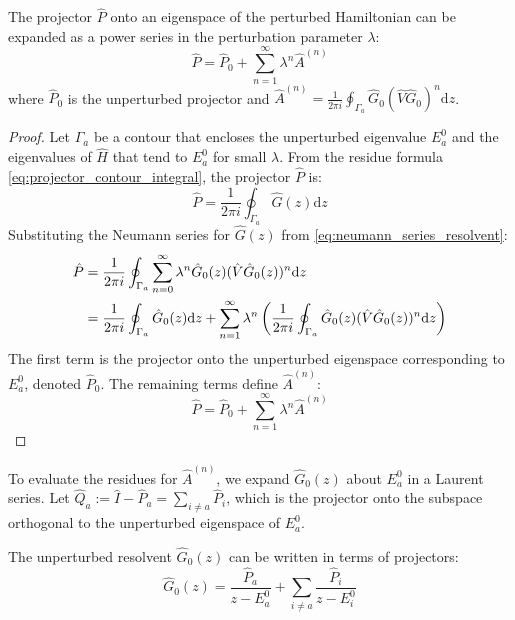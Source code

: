\begin{proposition}
    The projector $\hat P$ onto an eigenspace of the perturbed
    Hamiltonian can be expanded as a power series in the perturbation
    parameter $\lambda$:
    \begin{equation} \label{eq:projector_expansion}
        \hat P = \hat P_0+\sum_{n=1}^{\infty}\lambda^n \hat A^{(n)}
    \end{equation}
    where $\hat P_0$ is the unperturbed projector and $\hat
    A^{(n)}=\frac{1}{2\pi i}\oint_{\Gamma_a} \hat G_0(\hat V \hat
    G_0)^n \mathrm dz$.
\end{proposition}
\begin{proof}
    Let $\Gamma_a$ be a contour that encloses the unperturbed
    eigenvalue $E_a^0$ and the eigenvalues of $\hat H$ that tend to
    $E_a^0$ for small $\lambda$. From the residue formula
    \eqref{eq:projector_contour_integral}, the projector $\hat P$ is:
    \begin{equation}
        \hat P=\frac{1}{2\pi i}\oint_{\Gamma_a} \hat G(z)\mathrm d z
    \end{equation}
    Substituting the Neumann series for $\hat G(z)$ from
    \eqref{eq:neumann_series_resolvent}:
    \begin{align} \label{eq:projector_expansion_derivation}
        \hat P &= \frac{1}{2 \pi i} \oint_{\Gamma_a}
        \sum_{n=0}^\infty \lambda^n \hat G_0(z) (\hat V \hat
        G_0(z))^n \mathrm d z \\
        &= \frac{1}{2 \pi i} \oint_{\Gamma_a} \hat G_0(z) \mathrm d z
        + \sum_{n=1}^\infty \lambda^n \left(\frac{1}{2 \pi i}
            \oint_{\Gamma_a} \hat G_0(z) (\hat V \hat G_0(z))^n \mathrm d
        z\right) \notag
    \end{align}
    The first term is the projector onto the unperturbed eigenspace
    corresponding to $E_a^0$, denoted $\hat P_0$.
    The remaining terms define $\hat A^{(n)}$:
    \begin{equation}
        \hat P = \hat P_0+\sum_{n=1}^{\infty}\lambda^n \hat A^{(n)}
    \end{equation}
\end{proof}

To evaluate the residues for $\hat A^{(n)}$, we expand $\hat G_0(z)$
about $E_a^0$ in a Laurent series.
Let $\hat Q_a := \hat I-\hat P_a = \sum_{i \ne a} \hat P_i$, which is
the projector onto the subspace orthogonal to the unperturbed
eigenspace of $E_a^0$.
\begin{definition}
    The unperturbed resolvent $\hat G_0(z)$ can be written in terms
    of projectors:
    \begin{equation} \label{eq:G0_projector_sum}
        \hat G_0(z)=\frac{\hat P_a}{z-E_a^0}+\sum_{i\neq a}\frac{\hat
        P_i}{z-E_i^0}
    \end{equation}
\end{definition}

